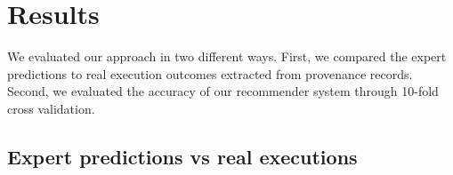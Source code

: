 \documentclass[conference]{IEEEtran}
\begin{document}

\section{Results}

We evaluated our approach in two different ways. First, 
we compared the expert predictions to 
real execution outcomes extracted from provenance records.
Second, we evaluated 
the accuracy of our recommender system through 10-fold cross validation. 

\subsection{Expert predictions vs real executions}

\end{document}
